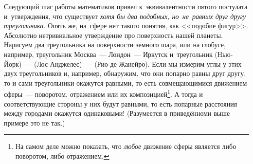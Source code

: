 {

Следующий шаг работы математиков привел к~эквивалентности пятого постулата и~утверждения, что
существует \textit{хотя бы два подобных, но~не~равных друг другу треугольника.} Опять же, на~сфере нет
такого понятия, как <<подобие фигур>>. Абсолютно нетривиальное утверждение про поверхность нашей
планеты. Нарисуем два треугольника на поверхности земного шара, или на глобусе, например, треугольник Москва~--- Лондон~--- Иркутск
и~треугольник (Нью-Йорк)~--- (Лос-Анджелес)~--- (Рио-де-Жанейро).
 Если мы измерим углы у этих двух
треугольников и, например, обнаружим, что они попарно равны друг другу, то и сами треугольники окажутся
равными, то есть совмещающимися движением сферы~--- поворотом, отражением или их композицией\footnote{На
самом деле можно показать, что {\em любое} движение сферы является либо поворотом, либо отражением.}.
А тогда и соответствующие стороны у них будут равными, то есть попарные расстояния между городами
окажутся одинаковыми! (Разумеется в приведённоми выше примере это не так.)

}


